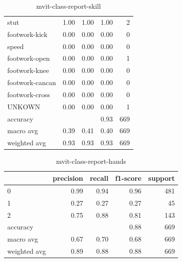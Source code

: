 \begin{table}[h!]
\begin{tabular}{|l|r|r|r|r|}
                stut &      1.00 &     1.00 &     1.00 &        2 \\
       footwork-kick &      0.00 &     0.00 &     0.00 &        0 \\
               speed &      0.00 &     0.00 &     0.00 &        0 \\
       footwork-open &      0.00 &     0.00 &     0.00 &        1 \\
       footwork-knee &      0.00 &     0.00 &     0.00 &        0 \\
     footwork-cancan &      0.00 &     0.00 &     0.00 &        0 \\
      footwork-cross &      0.00 &     0.00 &     0.00 &        0 \\
              UNKOWN &      0.00 &     0.00 &     0.00 &        1 \\
        \hline
            accuracy &           &          &     0.93 &      669 \\
           macro avg &      0.39 &     0.41 &     0.40 &      669 \\
        weighted avg &      0.93 &     0.93 &     0.93 &      669 \\
         \hline
    \end{tabular}
    \caption{mvit-class-report-skill}
    \label{tbl:mvit-class-report-skill}
\end{table}

\begin{table}[h!]
    \begin{tabular}{|l|r|r|r|r|}
                \hline & precision &   recall & f1-score &  support \\ \hline
                0 &      0.99 &     0.94 &     0.96 &      481 \\
                1 &      0.27 &     0.27 &     0.27 &       45 \\
                2 &      0.75 &     0.88 &     0.81 &      143 \\ \hline
         accuracy &           &          &     0.88 &      669 \\
        macro avg &      0.67 &     0.70 &     0.68 &      669 \\
     weighted avg &      0.89 &     0.88 &     0.88 &      669 \\
         \hline
    \end{tabular}
    \caption{mvit-class-report-hands}
    \label{tbl:mvit-class-report-hands}
\end{table}

